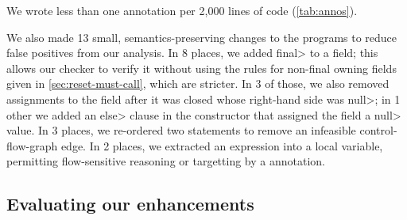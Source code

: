 We wrote less than one annotation per 2,000 lines of code (\cref{tab:annos}).

We also
made 13 small, semantics-preserving changes to the programs to reduce
false positives from our analysis.
%
In 8 places, we added \<final> to a field; this allows our checker to verify it without using
the rules for non-final owning fields given in \cref{sec:reset-must-call}, which are stricter.
In 3 of those, we also removed assignments to the field after it was closed whose right-hand
side was \<null>; in 1 other we added an \<else> clause in the constructor that assigned the field
a \<null> value.
%
In 3 places, we re-ordered two statements to remove an
infeasible control-flow-graph edge.
%
In 2 places, we extracted an expression into a local variable, permitting
flow-sensitive reasoning or targetting by a \CreateObligation annotation.


\subsection{Evaluating our enhancements}
\label{sec:ablation}

\newcommand{\abltablerow}[4]{\textbf{\smaller{#1}} & #2 & #3 & #4}


